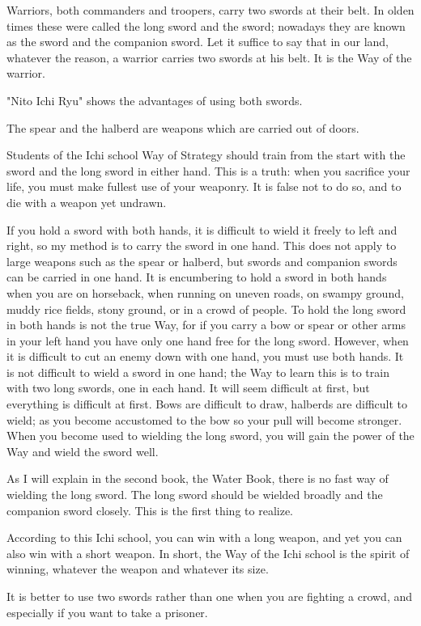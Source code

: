 Warriors, both commanders and troopers, carry two swords at their belt. In olden times these were called the long sword and the sword; nowadays they are known as the sword and the companion sword. Let it suffice to say that in our land, whatever the reason, a warrior carries two swords at his belt. It is the Way of the warrior.

"Nito Ichi Ryu" shows the advantages of using both swords.

The spear and the halberd are weapons which are carried out of doors.

Students of the Ichi school Way of Strategy should train from the start with the sword and the long sword in either hand. This is a truth: when you sacrifice your life, you must make fullest use of your weaponry. It is false not to do so, and to die with a weapon yet undrawn.

If you hold a sword with both hands, it is difficult to wield it freely to left and right, so my method is to carry the sword in one hand. This does not apply to large weapons such as the spear or halberd, but swords and companion swords can be carried in one hand. It is encumbering to hold a sword in both hands when you are on horseback, when running on uneven roads, on swampy ground, muddy rice fields, stony ground, or in a crowd of people. To hold the long sword in both hands is not the true Way, for if you carry a bow or spear or other arms in your left hand you have only one hand free for the long sword. However, when it is difficult to cut an enemy down with one hand, you must use both hands. It is not difficult to wield a sword in one hand; the Way to learn this is to train with two long swords, one in each hand. It will seem difficult at first, but everything is difficult at first. Bows are difficult to draw, halberds are difficult to wield; as you become accustomed to the bow so your pull will become stronger. When you become used to wielding the long sword, you will gain the power of the Way and wield the sword well.

As I will explain in the second book, the Water Book, there is no fast way of wielding the long sword. The long sword should be wielded broadly and the companion sword closely. This is the first thing to realize.

According to this Ichi school, you can win with a long weapon, and yet you can also win with a short weapon. In short, the Way of the Ichi school is the spirit of winning, whatever the weapon and whatever its size.

It is better to use two swords rather than one when you are fighting a crowd, and especially if you want to take a prisoner.

